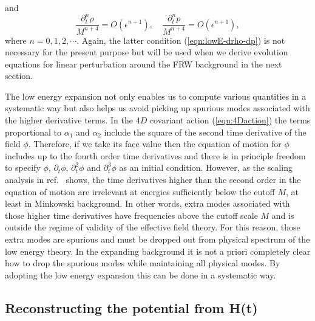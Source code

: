 and
%
\begin{equation}
 \frac{\partial_t^n\rho}{M^{n+4}} = O(\epsilon^{n+1}), \quad
 \frac{\partial_t^n p}{M^{n+4}} = O(\epsilon^{n+1}),
 \label{eqn:lowE-drho-dp}
\end{equation}
where $n=0,1,2,\cdots$. Again, the latter condition
(\ref{eqn:lowE-drho-dp}) is not necessary for the present purpose but
will be used when we derive evolution equations for linear perturbation
around the FRW background in the next section. 



The low energy expansion not only enables us to compute various
quantities in a systematic way but also helps us avoid picking up 
spurious modes associated with the higher derivative terms. In the $4D$
covariant action (\ref{eqn:4Daction}) the terms proportional to
$\alpha_1$ and $\alpha_2$ include the square of the second time
derivative of the field $\phi$. Therefore, if we take its face value
then the equation of motion for $\phi$ includes up to the fourth order
time derivatives and there is in principle freedom to specify $\phi$,
$\partial_t\phi$, $\partial_t^2\phi$ and $\partial_t^3\phi$ as an
initial condition. However, as the scaling analysis in
ref.~\cite{Arkani-Hamed:2003uy} shows, the time derivatives higher than
the second order in the equation of motion are irrelevant at energies
sufficiently below the cutoff $M$, at least in Minkowski background. In
other words, extra modes associated with those higher time derivatives
have frequencies above the cutoff scale $M$ and is outside the regime of 
validity of the effective field theory. For this reason, those extra
modes are spurious and must be dropped out from physical spectrum of the
low energy theory. In the expanding background it is not a priori
completely clear how to drop the spurious modes while maintaining all
physical modes. By adopting the low energy expansion this can be done in
a systematic way. 




\subsection{Reconstructing the potential from H(t)}
\label{subsec:reconstruct-V}

